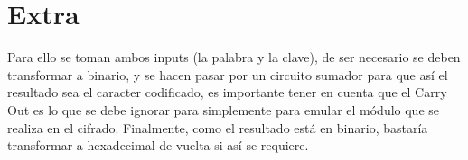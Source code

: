 \documentclass[11pt,letterpaper]{article}
\begin{document}
\vspace{0.2cm}
\section{Extra}
Para ello se toman ambos inputs (la palabra y la clave), de ser necesario se deben transformar a binario, y se hacen pasar por un circuito sumador para que así el resultado sea el caracter codificado, es importante tener en cuenta que el Carry Out es lo que se debe ignorar para simplemente para emular el módulo que se realiza en el cifrado. Finalmente, como el resultado está en binario, bastaría transformar a hexadecimal de vuelta si así se requiere.
\end{document}
